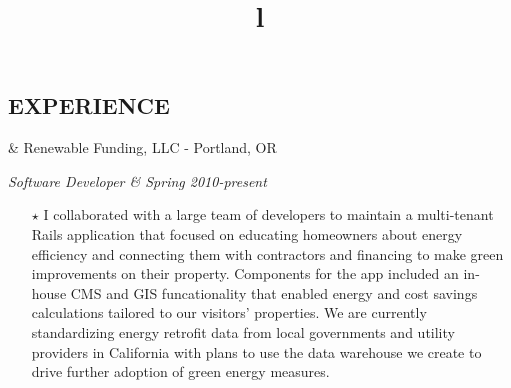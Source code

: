 \documentclass[10pt]{res} %
\begin{document}

  \address{
    \href{mailto:laurie.kemmerer@gmail.com}{laurie.kemmerer@gmail.com} \\
    (503) 866-4437
  }
  \address{
    \url{http://github.com/lkemmerer} \\
    \href{http://twitter.com/im\_a\_radish}{@im\_a\_radish}
  }

  \begin{resume}

    \section{EXPERIENCE}

    \begin{ncolumn}{2}
	    & \hfill {}Renewable Funding, LLC - Portland, OR \\
	    \title{l} \itshape Software Developer & \hfill{}Spring 2010-present \\
    \end{ncolumn}
    \begin{itemize} \itemsep -2pt
	    \item[$\star$]I collaborated with a large team of developers to maintain a multi-tenant Rails application that focused on educating homeowners about energy efficiency and connecting them with contractors and financing to make green improvements on their property.  Components for the app included an in-house CMS and GIS funcationality that enabled energy and cost savings calculations tailored to our visitors' properties.  We are currently standardizing energy retrofit data from local governments and utility providers in California with plans to use the data warehouse we create to drive further adoption of green energy measures.
    \end{itemize}


\end{resume}
\end{document}
